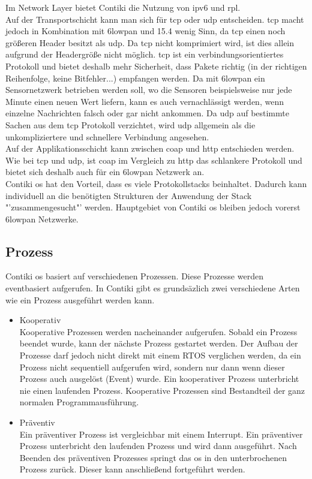 	Im Network Layer bietet Contiki die Nutzung von \ac{ipv6} und \ac{rpl}.\\
	Auf der Transportschicht kann man sich für \ac{tcp} oder \ac{udp} entscheiden. \ac{tcp} macht jedoch in Kombination mit \ac{6lowpan} und \ac{15.4} wenig Sinn, da \ac{tcp} einen noch größeren Header besitzt als \ac{udp}. Da \ac{tcp} nicht komprimiert wird, ist dies allein aufgrund der Headergröße nicht möglich. \ac{tcp} ist ein verbindungsorientiertes Protokoll und bietet deshalb mehr Sicherheit, dass Pakete richtig (in der richtigen Reihenfolge, keine Bitfehler...) empfangen werden. Da mit \ac{6lowpan} ein Sensornetzwerk betrieben werden soll, wo die Sensoren beispielsweise nur jede Minute einen neuen Wert liefern, kann es auch vernachlässigt werden, wenn einzelne Nachrichten falsch oder gar nicht ankommen. Da \ac{udp} auf bestimmte Sachen aus dem \ac{tcp} Protokoll verzichtet, wird \ac{udp} allgemein als die unkompliziertere und schnellere Verbindung angesehen.\\
	Auf der Applikationsschicht kann zwischen \ac{coap} und \ac{http} entschieden werden. Wie bei \ac{tcp} und \ac{udp}, ist \ac{coap} im Vergleich zu \ac{http} das schlankere Protokoll und bietet sich deshalb auch für ein \ac{6lowpan} Netzwerk an.\\
	
	Contiki \ac{os} hat den Vorteil, dass es viele Protokollstacks beinhaltet. Dadurch kann individuell an die benötigten Strukturen der Anwendung der Stack "'zusammengesucht"' werden. Hauptgebiet von Contiki \ac{os} bleiben jedoch vorerst \ac{6lowpan} Netzwerke.
	
	\subsection{Prozess}
	Contiki \ac{os} basiert auf verschiedenen Prozessen. Diese Prozesse werden eventbasiert aufgerufen. In Contiki gibt es grundsäzlich zwei verschiedene Arten wie ein Prozess ausgeführt werden kann.
	\begin{itemize}
		\item Kooperativ\\
		Kooperative Prozessen werden nacheinander aufgerufen. Sobald ein Prozess beendet wurde, kann der nächste Prozess gestartet werden. Der Aufbau der Prozesse darf jedoch nicht direkt mit einem RTOS verglichen werden, da ein Prozess nicht sequentiell aufgerufen wird, sondern nur dann wenn dieser Prozess auch ausgelöst (Event) wurde. Ein kooperativer Prozess unterbricht nie einen laufenden Prozess. Kooperative Prozessen sind Bestandteil der ganz normalen Programmausführung.
		\item Präventiv\\
		Ein präventiver Prozess ist vergleichbar mit einem Interrupt. Ein präventiver Prozess unterbricht den laufenden Prozess und wird dann ausgeführt. Nach Beenden des präventiven Prozesses springt das \ac{os} in den unterbrochenen Prozess zurück. Dieser kann anschließend fortgeführt werden. 
	\end{itemize}
	

